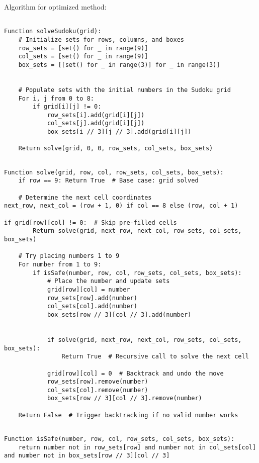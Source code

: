 \documentclass[conference]{IEEEtran}
\begin{document}
Algorithm for optimized method:
\begin{lstlisting}[style=codebox, caption=Initializes constraints and starts the Sudoku-solving process.
, label=lst:fourqueens]

Function solveSudoku(grid):
    # Initialize sets for rows, columns, and boxes
    row_sets = [set() for _ in range(9)]
    col_sets = [set() for _ in range(9)]
    box_sets = [[set() for _ in range(3)] for _ in range(3)]


    # Populate sets with the initial numbers in the Sudoku grid
    For i, j from 0 to 8:
        if grid[i][j] != 0:
            row_sets[i].add(grid[i][j])
            col_sets[j].add(grid[i][j])
            box_sets[i // 3][j // 3].add(grid[i][j])

    Return solve(grid, 0, 0, row_sets, col_sets, box_sets)
\end{lstlisting}
\begin{lstlisting}[style=codebox, caption=Recursively solves the Sudoku grid using backtracking., label=lst:fourqueens]

Function solve(grid, row, col, row_sets, col_sets, box_sets):
    if row == 9: Return True  # Base case: grid solved

    # Determine the next cell coordinates
next_row, next_col = (row + 1, 0) if col == 8 else (row, col + 1)

if grid[row][col] != 0:  # Skip pre-filled cells
        Return solve(grid, next_row, next_col, row_sets, col_sets, box_sets)

    # Try placing numbers 1 to 9
    For number from 1 to 9:
        if isSafe(number, row, col, row_sets, col_sets, box_sets):
            # Place the number and update sets
            grid[row][col] = number
            row_sets[row].add(number)
            col_sets[col].add(number)
            box_sets[row // 3][col // 3].add(number)


            if solve(grid, next_row, next_col, row_sets, col_sets, box_sets):
                Return True  # Recursive call to solve the next cell

            grid[row][col] = 0  # Backtrack and undo the move
            row_sets[row].remove(number)
            col_sets[col].remove(number)
            box_sets[row // 3][col // 3].remove(number)

    Return False  # Trigger backtracking if no valid number works
\end{lstlisting}
\begin{lstlisting}[style=codebox, caption=Checks if placing a number in the given cell follows Sudoku rules., label=lst:fourqueens]

Function isSafe(number, row, col, row_sets, col_sets, box_sets):
    return number not in row_sets[row] and number not in col_sets[col] and number not in box_sets[row // 3][col // 3]
\end{lstlisting}
\end{document}
